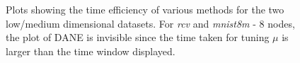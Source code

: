 \documentclass[twoside, 11pt]{article}
\begin{document}
\begin{figure}[H]
\centering



\caption{Plots showing the time efficiency of various methods for the two low/medium dimensional datasets. For {\it{rcv}} and {\it{mnist8m}} - 8 nodes, the plot of DANE is invisible since the time taken for tuning $\mu$ is larger than the time window displayed.}
\label{fig:timepass2}
\end{figure}
\end{document}
